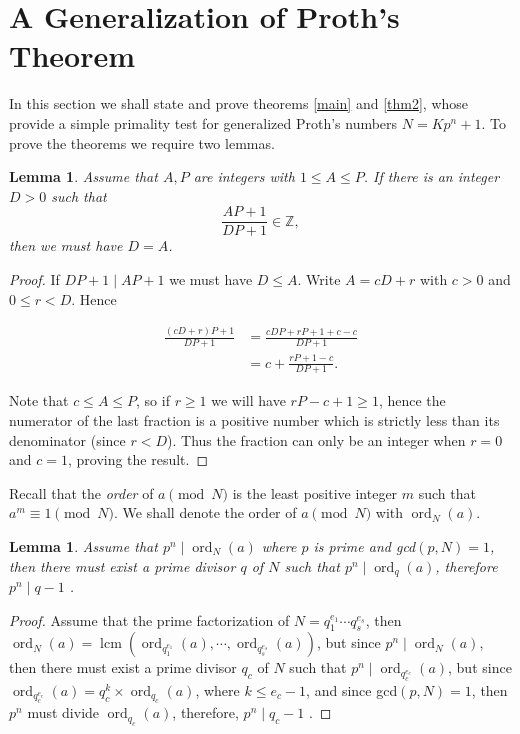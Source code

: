 \documentclass{amsart}
\newtheorem{lemma}[theorem]{Lemma}
\numberwithin{equation}{section}
\DeclareMathOperator{\lcm}{lcm}
\DeclareMathOperator{\ord}{ord}
\begin{document}
\section{A Generalization of Proth's Theorem} 

In this section we shall state and prove theorems \ref{main} and \ref{thm2}, whose provide a simple primality test for generalized Proth's numbers $N=Kp^n+1$. To prove the theorems we require two  lemmas.

\begin{lemma}\label{lem1}
	Assume that $A, P$ are integers with  $1\leq A \leq P$. If there is an integer $D>0$ such that 
	\[
	\frac{AP+1}{DP+1} \in \mathbb{Z},
	\]
	then we must have $D=A$.
\end{lemma}

\begin{proof}
	If $DP+1 \mid AP+1$ we must have $D\leq A$. Write $A=cD+r$ with $c> 0$ and $0\leq r<D$. Hence
	
	\begin{align*}
		\frac{(cD+r)P+1}{DP+1}&=\frac{cDP+rP+1+c-c}{DP+1}\\
		&=c+\frac{rP+1-c}{DP+1}.
	\end{align*}

	Note that $c\leq A \leq P$, so if $r\geq 1$ we will have $rP-c+1\geq 1$, hence the numerator of the last fraction is a positive number which is strictly less than its denominator (since $r<D$). Thus the fraction can only be an integer when $r=0$ and $c=1$, proving the result.
\end{proof}

Recall that the \emph{order} of $a \pmod N $ is the least positive integer $m$ such that $a^m \equiv 1 \pmod N$. We shall denote the order of $a \pmod N $ with $\ord_N(a)$.

\begin{lemma}\label{lem2}
	Assume that $p^n \mid \ord_N(a)$ where $p$ is prime and gcd$(p,N)=1$, then there must exist a prime divisor $q$ of $N$ such that $p^n \mid \ord_q(a)$, therefore $p^n \mid q-1$ .
\end{lemma}

\begin{proof}
	Assume that the prime factorization of $N=q_1^{e_1} \cdots q_s^{e_s}$, then $\ord_N(a)=\lcm(\ord_{q_1^{e_1}}(a),\cdots,\ord_{q_s^{e_s}}(a))$, but since $p^n \mid \ord_N(a)$, then there must exist a prime divisor $q_c$ of $N$ such that $p^n \mid \ord_{q_c^{e_c}}(a)$, but since $\ord_{q_c^{e_c}}(a) = q_c^k \times \ord_{q_c}(a) $, where $k \leq e_c-1$, and since gcd$(p,N)=1$, then $p^n$ must divide $\ord_{q_c}(a)$, therefore, $p^n \mid q_c-1$ .
\end{proof}
\end{document}
